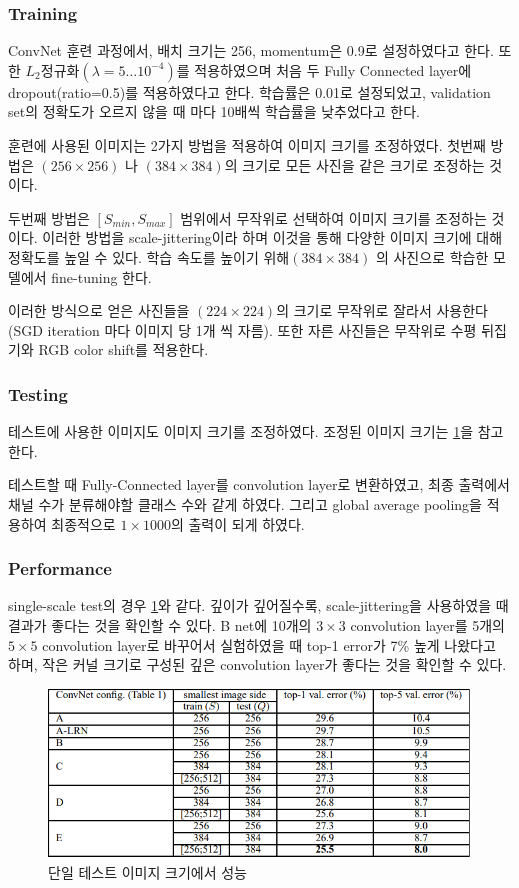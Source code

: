 \documentclass[extendedabs]{bmvc2k}
\begin{document}
\subsubsection{Training}
ConvNet 훈련 과정에서, 배치 크기는 256, momentum은 0.9로 설정하였다고 한다. 또한 $L_2$정규화$(\lambda = 5\dots10^{-4})$를 적용하였으며 처음 두 Fully Connected layer에 dropout(ratio=0.5)를 적용하였다고 한다. 학습률은 0.01로 설정되었고, validation set의 정확도가 오르지 않을 때 마다 10배씩 학습률을 낮추었다고 한다.

훈련에 사용된 이미지는 2가지 방법을 적용하여 이미지 크기를 조정하였다. 첫번째 방법은 $(256\times256)$ 나 $(384\times384)$의 크기로 모든 사진을 같은 크기로 조정하는 것이다.

두번째 방법은 $[S_{min},S_{max}]$ 범위에서 무작위로 선택하여 이미지 크기를 조정하는 것이다. 이러한 방법을 scale-jittering이라 하며 이것을 통해 다양한 이미지 크기에 대해 정확도를 높일 수 있다. 학습 속도를 높이기 위해$(384\times384)$ 의 사진으로 학습한 모델에서 fine-tuning 한다.

이러한 방식으로 얻은 사진들을 $(224\times224)$의 크기로 무작위로 잘라서 사용한다(SGD iteration 마다 이미지 당 1개 씩 자름). 또한 자른 사진들은 무작위로 수평 뒤집기와 RGB color shift를 적용한다.

\subsubsection{Testing}
테스트에 사용한 이미지도 이미지 크기를 조정하였다. 조정된 이미지 크기는 \ref{fig:VGGNetSingleErr}을 참고한다.

테스트할 때 Fully-Connected layer를 convolution layer로 변환하였고, 최종 출력에서 채널 수가 분류해야할 클래스 수와 같게 하였다. 그리고 global average pooling을 적용하여 최종적으로 $1\times1000$의 출력이 되게 하였다.

\subsubsection{Performance}
single-scale test의 경우 \ref{fig:VGGNetSingleErr}와 같다. 깊이가 깊어질수록, scale-jittering을 사용하였을 때 결과가 좋다는 것을 확인할 수 있다. B net에 10개의 $3\times3$ convolution layer를 5개의 $5\times5$ convolution layer로 바꾸어서 실험하였을 때 top-1 error가 7\% 높게 나왔다고 하며, 작은 커널 크기로 구성된 깊은 convolution layer가 좋다는 것을 확인할 수 있다.

\begin{figure}[t]
	\includegraphics[width=\linewidth]{images/vggnet_single.PNG}
	\caption{단일 테스트 이미지 크기에서 성능}
 \label{fig:VGGNetSingleErr}
	\vspace{-2mm}
\end{figure}
\end{document}
